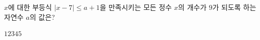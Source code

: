$x$에 대한 부등식 $|x-7|\le a+1$을 만족시키는 모든 정수 $x$의 개수가 $9$가 되도록 하는 자연수 $a$의 값은?
\begin{choices32}{$1$}{$2$}{$3$}{$4$}{$5$}\end{choices32}
